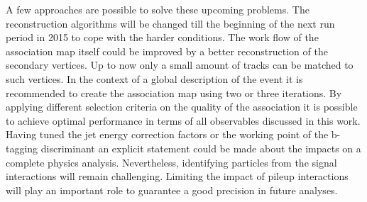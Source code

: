 A few approaches are possible to solve these upcoming problems. The reconstruction algorithms will be changed till the beginning of the next run period in 2015 to cope with the harder conditions. The work flow of the association map itself could be improved by a better reconstruction of the secondary vertices. Up to now only a small amount of tracks can be matched to such vertices.
In the context of a global description of the event it is recommended to create the association map using two or three iterations. By applying different selection criteria on the quality of the association it is possible to achieve optimal performance in terms of all observables discussed in this work. Having tuned the jet energy correction factors or the working point of the b-tagging discriminant an explicit statement could be made about the impacts on a complete physics analysis.
Nevertheless, identifying particles from the signal interactions will remain challenging. Limiting the impact of pileup interactions will play an important role to guarantee a good precision in future analyses.
